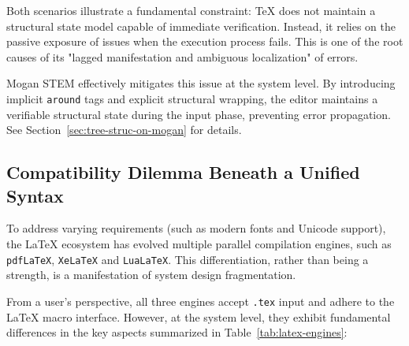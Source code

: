 Both scenarios illustrate a fundamental constraint: \TeX{} does not maintain a structural state model capable of immediate verification. Instead, it relies on the passive exposure of issues when the execution process fails. This is one of the root causes of its "lagged manifestation and ambiguous localization" of errors.

\begin{remark}
  Mogan STEM effectively mitigates this issue at the system level. By introducing implicit \texttt{around} tags and explicit structural wrapping, the editor maintains a verifiable structural state during the input phase, preventing error propagation. See Section~\ref{sec:tree-struc-on-mogan} for details.
\end{remark}

\subsection{Compatibility Dilemma Beneath a Unified Syntax}

To address varying requirements (such as modern fonts and Unicode support), the \LaTeX{} ecosystem has evolved multiple parallel compilation engines, such as \texttt{pdfLaTeX}, \texttt{XeLaTeX} and \texttt{LuaLaTeX}. This differentiation, rather than being a strength, is a manifestation of system design fragmentation.

From a user's perspective, all three engines accept \texttt{.tex} input and adhere to the \LaTeX{} macro interface. However, at the system level, they exhibit fundamental differences in the key aspects summarized in Table~\ref{tab:latex-engines}:

\begin{table}[htbp]
  \centering
  \caption{Comparison of \LaTeX{} Engines}
  \label{tab:latex-engines}
\end{table}

